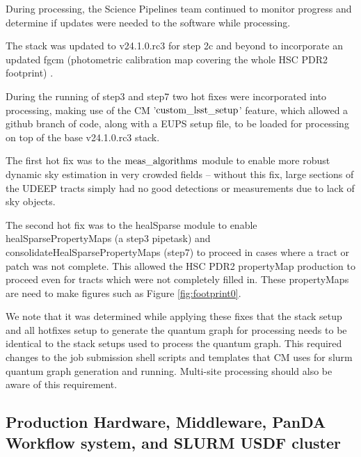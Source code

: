 During processing, the Science Pipelines team continued to monitor progress and determine if updates were
needed to the software while processing.

The stack was updated to v24.1.0.rc3 for step 2c and beyond to incorporate an updated fgcm (photometric
calibration map covering the whole HSC PDR2 footprint) .

During the running of step3 and step7 two hot fixes were incorporated into processing, making use
of the CM '$\rm custom\_lsst\_setup$' feature, which allowed a github branch of code, along with a EUPS setup
file, to be loaded for processing on top of the base v24.1.0.rc3 stack.

The first hot fix was to the $\rm meas\_algorithms$ module to enable more robust dynamic sky estimation in very
crowded fields -- without this fix, large sections of the UDEEP tracts simply had no good detections or
measurements due to lack of sky objects.

The second hot fix was to the healSparse module to enable healSparsePropertyMaps (a step3 pipetask) and 
consolidateHealSparsePropertyMaps (step7) to proceed in cases where a tract or patch was not complete.
This allowed the HSC PDR2 propertyMap production to proceed even for tracts which were 
not completely filled in. These propertyMaps are need to make figures such as Figure \ref{fig:footprint0}.

We note that it was determined while applying these fixes that the stack setup and all 
hotfixes setup to generate the quantum graph for processing needs to be identical to 
the stack setups used to process the quantum graph.  This required changes to the 
job submission shell scripts and templates that CM uses for slurm quantum 
graph generation and running.   Multi-site processing should also be aware of this requirement.

\subsection{Production Hardware, Middleware, PanDA Workflow system, and SLURM USDF cluster}


